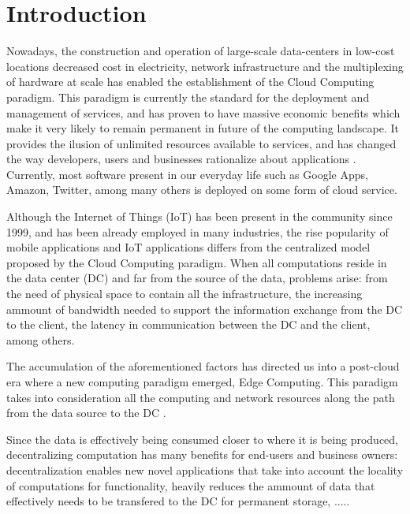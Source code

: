 \newcommand{\novathesis}{\emph{novathesis}}
\newcommand{\novathesisclass}{\texttt{novathesis.cls}}


\chapter{Introduction}
\label{cha:introduction}

Nowadays, the construction and operation of large-scale data-centers in low-cost locations decreased cost in electricity,
network infrastructure and the multiplexing of hardware at scale has enabled the establishment of the Cloud Computing paradigm.
This paradigm is currently the standard for the deployment and management of services, and has proven to have massive economic 
benefits which make it very likely to remain permanent in future of the computing landscape. 
It provides the ilusion of unlimited resources available to services, and has changed the way developers,
users and businesses rationalize about  applications \cite{Armbrust:2010:VCC:1721654.1721672}.
Currently, most software present in our everyday life such as Google Apps,
Amazon, Twitter, among many others is deployed on some form of cloud service. 

Although the Internet of Things (IoT) has been present in the community since 1999, and has been already employed in many
industries, the rise popularity of mobile applications and IoT applications differs from the centralized model proposed
by the Cloud Computing paradigm. When all computations reside in the data center (DC) and far  
from the source of the data, problems arise: from the need of physical space to contain all the infrastructure,
the increasing ammount of bandwidth needed to support the information exchange from the DC to the client,
the latency in communication between the DC and the client, among others. 

The accumulation of the aforementioned factors has directed us into a post-cloud era where
 a new computing paradigm emerged, Edge Computing. 
This paradigm takes into consideration all the computing and network resources along
the path from the data source to the DC \cite{iot_journal_shi_weisong_and_cao}.

Since the data is effectively being consumed closer to where it is being produced,
decentralizing computation has many benefits for end-users and business owners:
decentralization enables new novel applications that take into account the locality of computations for functionality,
heavily reduces the ammount of data that effectively needs to be transfered to the DC
for permanent storage, .....


